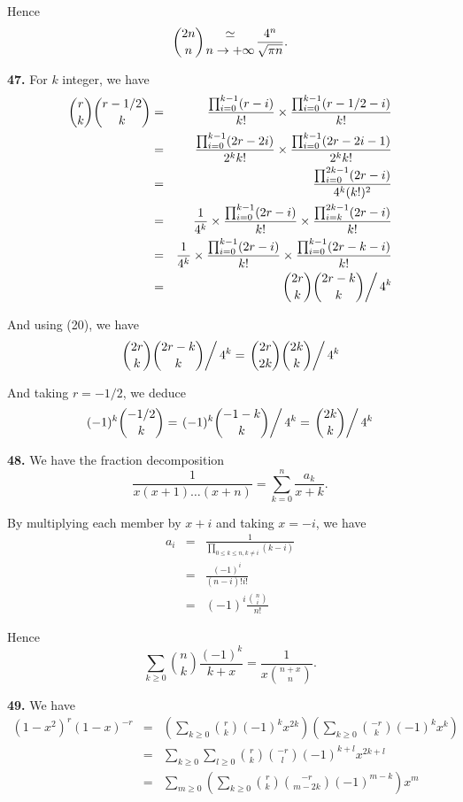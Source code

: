 \documentclass[a4paper,12pt]{article}
\newcommand{\newpar}[1]{\bigskip \noindent \textbf{#1.}}
\begin{document}
Hence
\[ {2n \choose n} {\simeq \atop n \to +\infty} \frac{4^n}{\sqrt{\pi
    n}}.\]

\newpar{47}  For $k$ integer, we have
\begin{eqnarray*}
  {r \choose k} {r-1/2 \choose k} &=&
  \frac{\prod_{i=0}^{k-1}(r-i)}{k!} \times
  \frac{\prod_{i=0}^{k-1}(r-1/2-i)}{k!} \\
  &=& \frac{\prod_{i=0}^{k-1}(2r-2i)}{2^kk!} \times
  \frac{\prod_{i=0}^{k-1}(2r-2i-1)}{2^kk!} \\
  &=& \frac{\prod_{i=0}^{2k-1}(2r-i)}{4^k (k!)^2} \\
  &=& \frac{1}{4^k} \times \frac{\prod_{i=0}^{k-1}(2r-i)}{k!} \times
  \frac{\prod_{i=k}^{2k-1}(2r-i)}{k!} \\
  &=& \frac{1}{4^k} \times \frac{\prod_{i=0}^{k-1}(2r-i)}{k!} \times
  \frac{\prod_{i=0}^{k-1}(2r-k-i)}{k!} \\
  &=& \left. {2r \choose k}{2r-k \choose k} \right/4^k
\end{eqnarray*}

And using (20), we have
\[ \left. {2r \choose k}{2r-k \choose k} \right/4^k = \left. {2r
  \choose 2k}{2k \choose k} \right/ 4^k\]

And taking $r = -1/2$, we deduce
\[ (-1)^k {-1/2 \choose k} = \left. (-1)^k {-1-k \choose k}\right/4^k = \left.
   {2k \choose k}\right/4^k\]

\newpar{48}  We have the fraction decomposition
\[ \frac{1}{x(x+1)\ldots(x+n)} = \sum_{k=0}^n \frac{a_k}{x+k}.\]

By multiplying each member by $x+i$ and taking $x = -i$, we have
\begin{eqnarray*}
  a_i &=& \frac{1}{\prod_{0\le k\le n, k\not=i} (k-i)} \\
  &=& \frac{(-1)^i}{(n-i)!i!} \\
  &=& (-1)^i \frac{{n \choose i}}{n!}
\end{eqnarray*}

Hence
\[ \sum_{k\ge 0} {n \choose k}\frac{(-1)^k}{k+x} = \frac{1}{x {n+x
    \choose n}}.\]

\newpar{49} We have
\begin{eqnarray*}
  (1-x^2)^r (1-x)^{-r} &=& \left( \sum_{k\ge 0} {r \choose k}(-1)^k
  x^{2k}\right) \left( \sum_{k\ge 0} {-r \choose k} (-1)^k x^k\right)
\\
&=& \sum_{k \ge 0} \sum_{l \ge 0} {r \choose k}{-r \choose l}
(-1)^{k+l} x^{2k+l} \\
&=& \sum_{m \ge 0} \left( \sum_{k \ge 0} {r \choose k}{-r \choose
  m-2k}(-1)^{m-k} \right) x^m
\end{eqnarray*}
\end{document}
